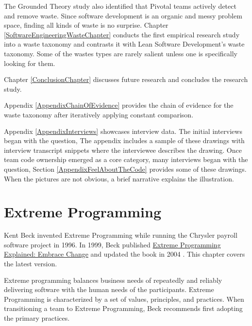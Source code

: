 The Grounded Theory study also identified that Pivotal teams actively detect and remove waste. Since software development is an organic and messy problem space, finding all kinds of waste is no surprise. Chapter \ref{SoftwareEngineeringWasteChapter} conducts the first empirical research study into a waste taxonomy and contrasts it with Lean Software Development’s waste taxonomy. Some of the wastes types are rarely salient unless one is specifically looking for them.

Chapter \ref{ConclusionChapter} discusses future research and concludes the research study. 

Appendix \ref{AppendixChainOfEvidence} provides the chain of evidence for the waste taxonomy after iteratively applying constant comparison. 

Appendix \ref{AppendixInterviews} showcases interview data. The initial interviews began with the question,  The appendix includes a sample of these drawings with interview transcript snippets where the interviewee describes the drawing. Once team code ownership emerged as a core category, many interviews began with the question,  Section \ref{AppendixFeelAboutTheCode} provides some of these drawings. When the pictures are not obvious, a brief narrative explains the illustration.


\chapter{Extreme Programming}
\label{ExtremeProgramming}

Kent Beck invented Extreme Programming while running the Chrysler payroll software project in 1996. \cite{BeckExtremeProgramming1999} In 1999, Beck published \underline{Extreme Programming Explained: Embrace Change}  \cite{BeckExtremeProgramming1999} and updated the book in 2004  \cite{BeckExtremeProgramming2004}. This chapter covers the latest version. 

Extreme programming balances business needs of repeatedly and reliably delivering software with the human needs of the participants. Extreme Programming is characterized by a set of values, principles, and practices. When transitioning a team to Extreme Programming, Beck recommends first adopting the primary practices. 
